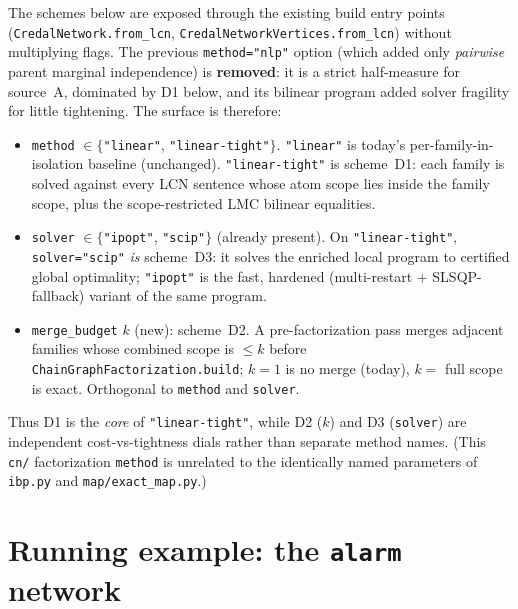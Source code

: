 \documentclass[11pt]{article}
\begin{document}
The schemes below are exposed through the existing build entry points
(\texttt{CredalNetwork.from\_lcn}, \texttt{CredalNetworkVertices.from\_lcn}) without
multiplying flags. The previous \texttt{method="nlp"} option (which added only
\emph{pairwise} parent marginal independence) is \textbf{removed}: it is a strict
half-measure for source~A, dominated by D1 below, and its bilinear program added solver
fragility for little tightening. The surface is therefore:
\begin{itemize}
  \item \texttt{method} $\in\{$\texttt{"linear"}, \texttt{"linear-tight"}$\}$. \texttt{"linear"}
    is today's per-family-in-isolation baseline (unchanged). \texttt{"linear-tight"} is
    scheme~D1: each family is solved against every LCN sentence whose atom scope lies inside
    the family scope, plus the scope-restricted LMC bilinear equalities.
  \item \texttt{solver} $\in\{$\texttt{"ipopt"}, \texttt{"scip"}$\}$ (already present). On
    \texttt{"linear-tight"}, \texttt{solver="scip"} \emph{is} scheme~D3: it solves the
    enriched local program to certified global optimality; \texttt{"ipopt"} is the fast,
    hardened (multi-restart $+$ SLSQP-fallback) variant of the same program.
  \item \texttt{merge\_budget} $k$ (new): scheme~D2. A pre-factorization pass merges adjacent
    families whose combined scope is $\le k$ before \texttt{ChainGraphFactorization.build};
    $k{=}1$ is no merge (today), $k{=}$ full scope is exact. Orthogonal to \texttt{method}
    and \texttt{solver}.
\end{itemize}
Thus D1 is the \emph{core} of \texttt{"linear-tight"}, while D2 ($k$) and D3 (\texttt{solver})
are independent cost-vs-tightness dials rather than separate method names. (This \texttt{cn/}
factorization \texttt{method} is unrelated to the identically named parameters of
\texttt{ibp.py} and \texttt{map/exact\_map.py}.)

\section{Running example: the \texttt{alarm} network}\label{sec:example}
\end{document}
